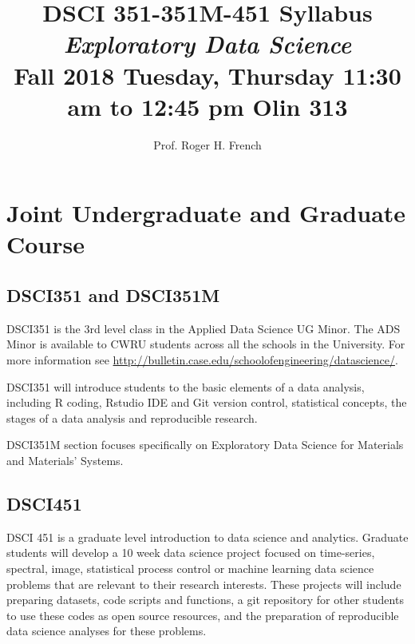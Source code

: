 \documentclass[11pt]{article} %
\title{DSCI 351-351M-451 Syllabus \\ \emph{Exploratory Data Science} \\ Fall 2018 	Tuesday, Thursday 11:30 am to 12:45 pm	Olin 313}
\author{Prof. Roger H. French}
\begin{document}
\maketitle


\section{Joint Undergraduate and Graduate Course}

  \subsection{DSCI351 and DSCI351M}
  
    DSCI351 is the 3rd level class in the Applied Data Science UG Minor. 
    The ADS Minor is available to CWRU students across all the schools in the University. 
    For more information see  \href{''http://bulletin.case.edu/schoolofengineering/datascience/''}{http://bulletin.case.edu/schoolofengineering/datascience/}. 
    
    DSCI351 will introduce students to the basic elements of a data analysis, including R coding, Rstudio IDE and Git version control, statistical concepts, the stages of a data analysis and reproducible research. 
    
    DSCI351M section focuses specifically on Exploratory Data Science for Materials and Materials' Systems. 

  \subsection{DSCI451}
  
    DSCI 451 is a graduate level introduction to data science and analytics. 
    Graduate students will develop a 10 week data science project focused on time-series, spectral, image, statistical process control or machine learning data science problems that are relevant to their research interests. 
    These projects will include preparing datasets, code scripts and functions, a git repository for other students to use these codes as open source resources, and the preparation of reproducible data science analyses for these problems. 
\end{document}
